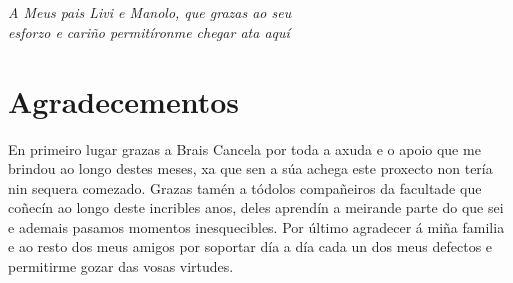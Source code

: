
\chapter*{}

\begin{flushright}
\emph{A Meus pais Livi e Manolo, que grazas ao seu \\esforzo e cariño permitíronme chegar ata aquí}
\end{flushright}


\chapter*{Agradecementos}

En primeiro lugar grazas a Brais Cancela por toda a axuda e o apoio que me brindou 
ao longo destes meses, xa que sen a súa achega este proxecto non tería nin sequera comezado.
Grazas tamén a tódolos compañeiros da facultade que coñecín ao longo deste incribles anos,
deles aprendín a meirande parte do que sei e ademais pasamos momentos inesquecibles. Por
último agradecer á miña familia e ao resto dos meus amigos por soportar día a día cada 
un dos meus defectos e permitirme gozar das vosas virtudes.
